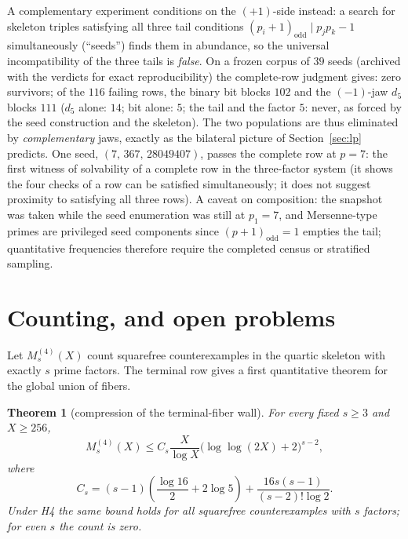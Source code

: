 \documentclass[11pt]{amsart}
\newtheorem{theorem}{Theorem}[section]
\theoremstyle{definition}
\theoremstyle{remark}
\begin{document}
A complementary experiment conditions on the $(+1)$-side instead: a search
for skeleton triples satisfying all three tail conditions
$(p_i+1)_{\mathrm{odd}} \mid p_jp_k - 1$ simultaneously (``seeds'') finds
them in abundance, so the universal incompatibility of the three tails is
\emph{false}. On a frozen corpus of $39$ seeds (archived with the verdicts
for exact reproducibility) the complete-row judgment gives: zero survivors;
of the $116$ failing rows, the binary bit blocks $102$ and the $(-1)$-jaw
$d_{5}$ blocks $111$ ($d_5$ alone: $14$; bit alone: $5$; the tail and the
factor $5$: never, as forced by the seed construction and the skeleton).
The two populations are thus eliminated by \emph{complementary} jaws,
exactly as the bilateral picture of Section~\ref{sec:lp} predicts. One
seed, $(7,\,367,\,28049407)$, passes the complete row at $p = 7$: the
first witness of solvability of a complete row in the three-factor system
(it shows the four checks of a row can be satisfied simultaneously; it does
not suggest proximity to satisfying all three rows). A caveat on
composition: the snapshot was taken while the seed enumeration was still at
$p_1 = 7$, and Mersenne-type primes are privileged seed components since
$(p+1)_{\mathrm{odd}} = 1$ empties the tail; quantitative frequencies
therefore require the completed census or stratified sampling.

\section{Counting, and open problems}\label{sec:counting}

Let \(M_s^{(4)}(X)\) count squarefree counterexamples in the quartic
skeleton with exactly \(s\) prime factors. The terminal row gives a first
quantitative theorem for the global union of fibers.

\begin{theorem}[compression of the terminal-fiber wall]
\label{thm:secondwall}
For every fixed \(s\ge3\) and \(X\ge256\),
\[
M_s^{(4)}(X)\le
C_s\frac{X}{\log X}
\bigl(\log\log(2X)+2\bigr)^{s-2},
\tag{10.1}
\]
where
\[
C_s=(s-1)\left(\frac{\log16}{2}+2\log5\right)
+
\frac{16s(s-1)}{(s-2)!\log2}.
\tag{10.2}
\]
Under H4 the same bound holds for all squarefree counterexamples with
\(s\) factors; for even \(s\) the count is zero.
\end{theorem}
\end{document}
